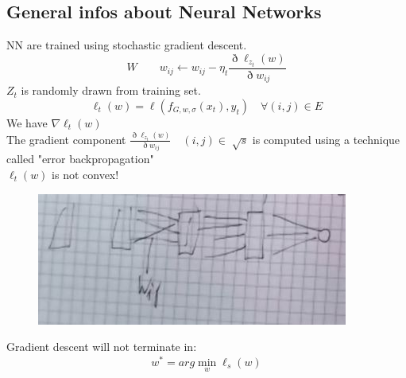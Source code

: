 \documentclass[../main.tex]{subfiles}
\begin{document}
\subsection{General infos about Neural Networks}
NN are trained using stochastic gradient descent.
$$
W \qquad w_{ij} \leftarrow w_{ij} - \eta_t \frac{\eth \ell_{z_t}(w)}{\eth w_{ij}} 
$$
$Z_t$ is randomly drawn from training set.
\\
$$
\ell_t(w) = \ell(f_{G,w,\sigma}(x_t),y_t) \quad \forall (i,j) \in E
$$
We have $ \nabla \ell_t(w)$
\\ The gradient component $\frac{\eth \ell_{z_t}(w)}{\eth w_{ij}} \quad (i,j) \in \sqrt[]{s}$ is computed using a technique called "error backpropagation"
\\
$\ell_t(w)$ is not convex!
\begin{figure}[h]
    \centering
    \includegraphics[width=0.4\linewidth]{../img/lez24-img16.JPG}
    \caption{}
\end{figure}
Gradient descent will not terminate in: $$
w^* = arg \min_w \hat{\ell}_s (w)
$$
\\
\end{document}
